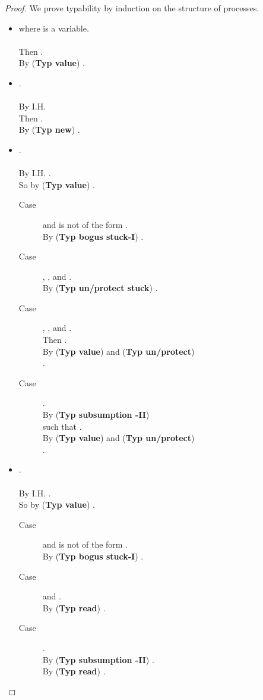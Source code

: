 \documentclass{sigplanconf}
\newcommand{\trule}[1]{(\textbf{Typ #1})}
\begin{document}
\begin{proof} We prove typability by induction on the structure of processes.
\begin{itemize}
\item  where  is a variable.\\
\\
Then .\\
By \trule{value} .\\
\item .\\
\\
By I.H. \\
Then .\\
By \trule{new} .\\
\item .\\
\\
By I.H. .\\
So by \trule{value} .
\begin{description}
\item[Case]  and  is not of the form .\\
By \trule{bogus stuck-I} .
\item[Case] , , and .\\
By \trule{un/protect stuck} .
\item[Case] , , and .\\
Then .\\
By \trule{value} and \trule{un/protect} \\
 .
\item[Case] .\\
By \trule{subsumption -II} \\
  such that .\\
By \trule{value} and \trule{un/protect} \\
 .
\end{description}

\item .\\
\\
By I.H. .\\
So by \trule{value} .
\begin{description}
\item[Case]  and  is not of the form .\\
By \trule{bogus stuck-I} .
\item[Case]  and .\\
By \trule{read} .
\item[Case] .\\
By \trule{subsumption -II} .\\
By \trule{read} .
\end{description}


\end{itemize}
\end{proof}
\end{document}
